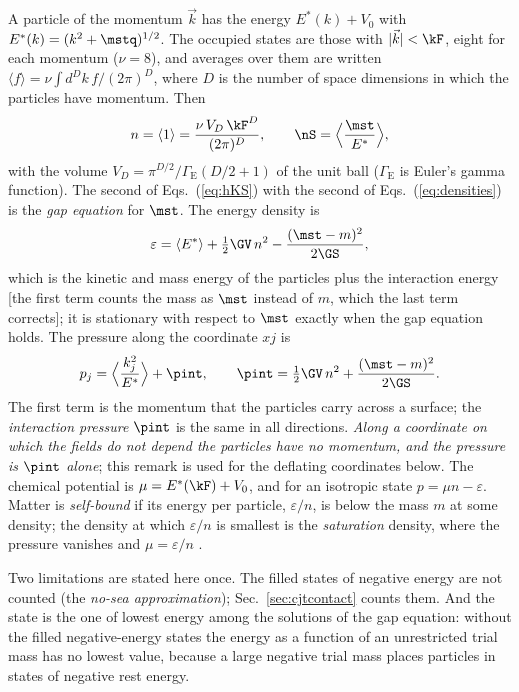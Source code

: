 A particle of the momentum $\vec k$ has the energy $E^{*}(k)+V_0$ with
$E^{*}(k)=(k^{2}+\mstq)^{1/2}$. The occupied states are those with $|\vec k|<\kF$, eight for each
momentum ($\nu=8$), and averages over them are written
$\langle f\rangle=\nu\int d^{D}k\,f/(2\pi)^{D}$, where $D$ is the number of space dimensions in which
the particles have momentum. Then
\begin{equation}
n=\langle1\rangle=\frac{\nu\,V_D\,\kF^{D}}{(2\pi)^{D}},\qquad\nS=\Big\langle\frac{\mst}{E^{*}}\Big\rangle,
\label{eq:densities}
\end{equation}
with the volume $V_D=\pi^{D/2}/\Gamma_{\mathrm E}(D/2+1)$ of the unit ball ($\Gamma_{\mathrm E}$ is
Euler's gamma function). The second of Eqs.~(\ref{eq:hKS}) with the second of
Eqs.~(\ref{eq:densities}) is the \emph{gap equation} for $\mst$. The energy density is
\begin{equation}
\varepsilon=\langle E^{*}\rangle+\tfrac12\GV\,n^{2}-\frac{(\mst-m)^{2}}{2\GS},
\label{eq:epsKS}
\end{equation}
which is the kinetic and mass energy of the particles plus the interaction energy [the first term
counts the mass as $\mst$ instead of $m$, which the last term corrects]; it is stationary with
respect to $\mst$ exactly when the gap equation holds. The pressure along the coordinate $xj$ is
\begin{equation}
p_j=\Big\langle\frac{k_j^{2}}{E^{*}}\Big\rangle+\pint,\qquad\pint=\tfrac12\GV\,n^{2}+\frac{(\mst-m)^{2}}{2\GS}.
\label{eq:pKS}
\end{equation}
The first term is the momentum that the particles carry across a surface; the \emph{interaction
pressure} $\pint$ is the same in all directions. \emph{Along a coordinate on which the fields do not
depend the particles have no momentum, and the pressure is $\pint$ alone}; this remark is used for
the deflating coordinates below. The chemical potential is $\mu=E^{*}(\kF)+V_0$, and for an
isotropic state $p=\mu n-\varepsilon$. Matter is \emph{self-bound} if its energy per particle,
$\varepsilon/n$, is below the mass $m$ at some density; the density at which $\varepsilon/n$ is
smallest is the \emph{saturation} density, where the pressure vanishes and
$\mu=\varepsilon/n$ \cite{HugenholtzVanHove1958}.

Two limitations are stated here once. The filled states of negative energy are not counted (the
\emph{no-sea approximation}); Sec.~\ref{sec:cjtcontact} counts them. And the state is the one of
lowest energy among the solutions of the gap equation: without the filled negative-energy states the
energy as a function of an unrestricted trial mass has no lowest value, because a large negative
trial mass places particles in states of negative rest energy.

